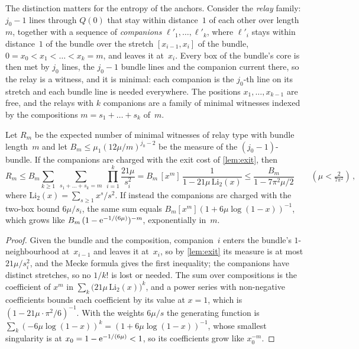 \documentclass[11pt,letterpaper]{article}
\begin{document}
The distinction matters for the entropy of the anchors. Consider the \emph{relay} family: $j_0-1$ lines through $Q(0)$ that stay within distance~$1$ of each other over length~$m$, together with a sequence of \emph{companions} $\ell'_1,\dots,\ell'_k$, where $\ell'_i$ stays within distance~$1$ of the bundle over the stretch $[x_{i-1},x_i]$ of the bundle, $0=x_0<x_1<\dots<x_k=m$, and leaves it at~$x_i$. Every box of the bundle's core is then met by $j_0$ lines, the $j_0-1$ bundle lines and the companion current there, so the relay is a witness, and it is minimal: each companion is the $j_0$-th line on its stretch and each bundle line is needed everywhere. The positions $x_1,\dots,x_{k-1}$ are free, and the relays with $k$ companions are a family of minimal witnesses indexed by the compositions $m=s_1+\dots+s_k$ of~$m$.

\begin{lemma}[Relays]
\label{lem:relay}
Let $R_m$ be the expected number of minimal witnesses of relay type with bundle length~$m$ and let $B_m\le\mu_1(12\mu/m)^{j_0-2}$ be the measure of the $(j_0-1)$-bundle. If the companions are charged with the exit cost of \cref{lem:exit}, then
\begin{equation}
\label{eq:relay}
  R_m\le B_m\sum_{k\ge1}\ \sum_{s_1+\dots+s_k=m}\ \prod_{i=1}^k\frac{21\mu}{s_i^2}
  = B_m\,[x^m]\,\frac{1}{1-21\mu\,\mathrm{Li}_2(x)}\le\frac{B_m}{1-7\pi^2\mu/2}\qquad(\mu<\tfrac{2}{7\pi^2})\,,
\end{equation}
where $\mathrm{Li}_2(x)=\sum_{s\ge1}x^s/s^2$. If instead the companions are charged with the two-box bound $6\mu/s_i$, the same sum equals $B_m[x^m](1+6\mu\log(1-x))^{-1}$, which grows like $B_m\,(1-\mathrm{e}^{-1/(6\mu)})^{-m}$, exponentially in~$m$.
\end{lemma}

\begin{proof}
Given the bundle and the composition, companion~$i$ enters the bundle's $1$-neighbourhood at~$x_{i-1}$ and leaves it at~$x_i$, so by \cref{lem:exit} its measure is at most $21\mu/s_i^2$, and the Mecke formula gives the first inequality; the companions have distinct stretches, so no $1/k!$ is lost or needed. The sum over compositions is the coefficient of $x^m$ in $\sum_k\bigl(21\mu\,\mathrm{Li}_2(x)\bigr)^k$, and a power series with non-negative coefficients bounds each coefficient by its value at $x=1$, which is $(1-21\mu\cdot\pi^2/6)^{-1}$. With the weights $6\mu/s$ the generating function is $\sum_k(-6\mu\log(1-x))^k=(1+6\mu\log(1-x))^{-1}$, whose smallest singularity is at $x_0=1-\mathrm{e}^{-1/(6\mu)}<1$, so its coefficients grow like $x_0^{-m}$.
\end{proof}
\end{document}
